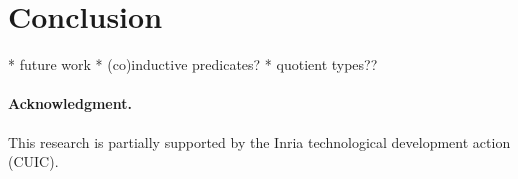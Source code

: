 \documentclass[runningheads,a4paper]{llncs}
\begin{document}
\section{Conclusion}
\label{sec:conclusion}

  * future work
    * (co)inductive predicates?
    * quotient types??

{%
\def\ackname{Acknowledgment}
\paragraph{%
\ackname.}

This research is partially supported by the Inria technological development
action  (CUIC).

}



{


}
\end{document}
